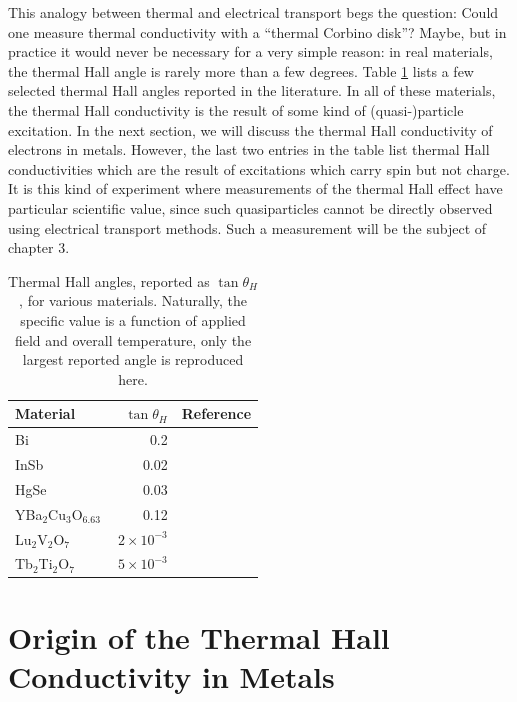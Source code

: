 \documentclass{thesis-umich}
\begin{document}
This analogy between thermal and electrical transport begs the question: Could
one measure thermal conductivity with a ``thermal Corbino disk''? Maybe, but in
practice it would never be necessary for a very simple reason: in real
materials, the thermal Hall angle is rarely more than a few degrees. Table
\ref{tab:hall_angles} lists a few selected thermal Hall angles reported in the
literature. In all of these materials, the thermal Hall conductivity is the
result of some kind of (quasi-)particle excitation. In the next section, we
will discuss the thermal Hall conductivity of electrons in metals. However, the
last two entries in the table list thermal Hall conductivities which are the
result of excitations which carry spin but not charge. It is this kind of
experiment where measurements of the thermal Hall effect have particular
scientific value, since such quasiparticles cannot be directly observed using
electrical transport methods. Such a measurement will be the subject of chapter
3.

\begin{table}
\centering
\label{tab:hall_angles}
\begin{tabular}{l|r|c}
\hline
Material & $\tan \theta_H$ & Reference \\
\hline
Bi & 0.2 & \cite{Kobayashi2012}  \\
InSb & 0.02 & \cite{Mette1963} \\
HgSe & 0.03 & \cite{Whitsett1961} \\
YBa$_2$Cu$_3$O$_{6.63}$ & 0.12 & \cite{Krishana1999} \\
Lu$_2$V$_2$O$_7$ & $2 \times 10^{-3}$ & \cite{Onose2010} \\
Tb$_2$Ti$_2$O$_7$ & $~5 \times 10^{-3}$ & \cite{Hirschberger2015} \\
\hline
\end{tabular}
\caption[Example Thermal Hall Angles]{Thermal Hall angles, reported as $\tan \theta_H$, for various materials. Naturally, the specific value is a function of applied field and overall temperature, only the largest reported angle is reproduced here.}
\end{table}
\section{Origin of the Thermal Hall Conductivity in Metals}
\end{document}
